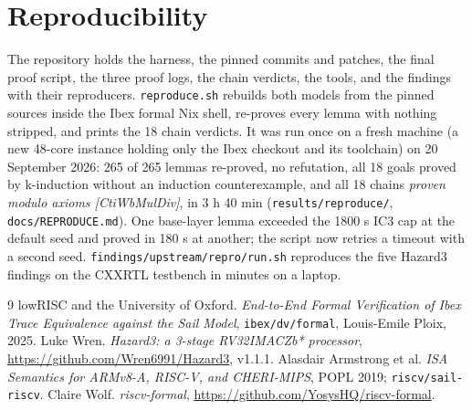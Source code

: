 \documentclass[11pt]{article}
\newcommand{\code}[1]{\texttt{#1}}
\begin{document}
\section*{Reproducibility}

The repository holds the harness, the pinned commits and patches, the final
proof script, the three proof logs, the chain verdicts, the tools, and the
findings with their reproducers. \code{reproduce.sh} rebuilds both models
from the pinned sources inside the Ibex formal Nix shell, re-proves every
lemma with nothing stripped, and prints the 18 chain verdicts. It was run once
on a fresh machine (a new 48-core instance holding only the Ibex checkout and
its toolchain) on 20 September 2026: 265 of 265 lemmas re-proved, no
refutation, all 18 goals proved by k-induction without an induction
counterexample, and all 18 chains \emph{proven modulo axioms [CtiWbMulDiv]},
in 3 h 40 min (\code{results/reproduce/}, \code{docs/REPRODUCE.md}). One
base-layer lemma exceeded the 1800 s IC3 cap at the default seed and proved in
180 s at another; the script now retries a timeout with a second seed.
\code{findings/upstream/repro/run.sh} reproduces the five Hazard3 findings on
the CXXRTL testbench in minutes on a laptop.

\begin{thebibliography}{9}
 lowRISC and the University of Oxford. \emph{End-to-End
  Formal Verification of Ibex Trace Equivalence against the Sail Model},
  \code{ibex/dv/formal}, Louis-Emile Ploix, 2025.
 Luke Wren. \emph{Hazard3: a 3-stage RV32IMACZb* processor},
  \url{https://github.com/Wren6991/Hazard3}, v1.1.1.
 Alasdair Armstrong et al. \emph{ISA Semantics for ARMv8-A,
  RISC-V, and CHERI-MIPS}, POPL 2019; \code{riscv/sail-riscv}.
 Claire Wolf. \emph{riscv-formal},
  \url{https://github.com/YosysHQ/riscv-formal}.
\end{thebibliography}
\end{document}
